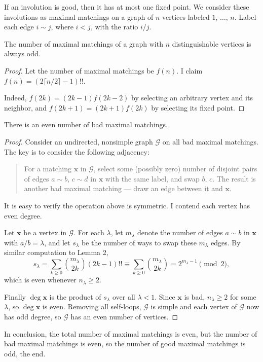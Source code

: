 If an involution is good, then it has at most one fixed point. We consider these involutions as maximal matchings on a graph of $n$ vertices labeled $1$, $\ldots$, $n$. Label each edge $i\sim j$, where $i<j$, with the ratio $i/j$.
\begin{lemma}
    The number of maximal matchings of a graph with $n$ distinguishable vertices is always odd.
\end{lemma}
\begin{proof}
    Let the number of maximal matchings be $f(n)$. I claim $f(n)=(2\lceil n/2\rceil-1)!!$.

    Indeed, $f(2k)=(2k-1)f(2k-2)$ by selecting an arbitrary vertex and its neighbor, and $f(2k+1)=(2k+1)f(2k)$ by selecting its fixed point.
\end{proof}
\begin{lemma}
    There is an even number of bad maximal matchings.
\end{lemma}
\begin{proof}
    Consider an undirected, nonsimple graph $\mathcal G$ on all bad maximal matchings. The key is to consider the following adjacency:
    \begin{quote}
        For a matching $\mathbf x$ in $\mathcal G$, select some (possibly zero) number of disjoint pairs of edges $a\sim b$, $c\sim d$ in $\mathbf x$ with the same label, and swap $b$, $c$. The result is another bad maximal matching --- draw an edge between it and $\mathbf x$.
    \end{quote}
    It is easy to verify the operation above is symmetric. I contend each vertex has even degree.

    Let $\mathbf x$ be a vertex in $\mathcal G$. For each $\lambda$, let $m_\lambda$ denote the number of edges $a\sim b$ in $\mathbf x$ with $a/b=\lambda$, and let $s_\lambda$ be the number of ways to swap these $m_\lambda$ edges. By similar computation to Lemma 2, \[s_\lambda=\sum_{k\ge0}\binom{m_\lambda}{2k}(2k-1)!!\equiv\sum_{k\ge0}\binom{m_\lambda}{2k}=2^{m_\lambda-1}\pmod2,\]
    which is even whenever $n_\lambda\ge2$.

    Finally $\deg\mathbf x$ is the product of $s_\lambda$ over all $\lambda<1$. Since $\mathbf x$ is bad, $n_\lambda\ge2$ for some $\lambda$, so $\deg\mathbf x$ is even. Removing all self-loops, $\mathcal G$ is simple and each vertex of $\mathcal G$ now has odd degree, so $\mathcal G$ has an even number of vertices.
\end{proof}

In conclusion, the total number of maximal matchings is even, but the number of bad maximal matchings is even, so the number of good maximal matchings is odd, the end.

